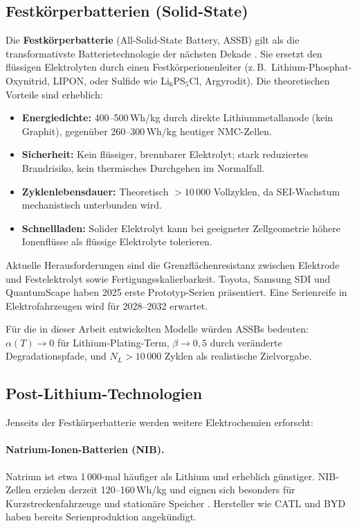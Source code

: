 ﻿\documentclass[a4paper,12pt]{article}
\theoremstyle{definition}
\begin{document}
\subsection{Festk\"orperbatterien (Solid-State)}

Die \textbf{Festk\"orperbatterie} (All-Solid-State Battery, ASSB) gilt als
die transformativste Batterietechnologie der n\"achsten Dekade \cite{Janek2016}.
Sie ersetzt den fl\"ussigen Elektrolyten durch einen Festk\"orperionenleiter
(z.\,B.\ Lithium-Phosphat-Oxynitrid, LIPON, oder Sulfide wie
Li$_6$PS$_5$Cl, Argyrodit). Die theoretischen Vorteile sind erheblich:

\begin{itemize}
  \item \textbf{Energiedichte:} 400--500\,Wh/kg durch direkte Lithiummetallanode
    (kein Graphit), gegen\"uber 260--300\,Wh/kg heutiger NMC-Zellen.
  \item \textbf{Sicherheit:} Kein fl\"ussiger, brennbarer Elektrolyt;
    stark reduziertes Brandrisiko, kein thermisches Durchgehen im Normalfall.
  \item \textbf{Zyklenlebensdauer:} Theoretisch $>10\,000$ Vollzyklen,
    da SEI-Wachstum mechanistisch unterbunden wird.
  \item \textbf{Schnellladen:} Solider Elektrolyt kann bei geeigneter
    Zellgeometrie h\"ohere Ionenfl\"usse als fl\"ussige Elektrolyte tolerieren.
\end{itemize}

Aktuelle Herausforderungen sind die Grenzfl\"achenresistanz zwischen Elektrode
und Festelektrolyt sowie Fertigungsskalierbarkeit. Toyota, Samsung SDI und
QuantumScape haben 2025 erste Prototyp-Serien pr\"asentiert. Eine
Serienreife in Elektrofahrzeugen wird f\"ur 2028--2032 erwartet.

F\"ur die in dieser Arbeit entwickelten Modelle w\"urden ASSBs bedeuten:
$\alpha(T) \to 0$ f\"ur Lithium-Plating-Term, $\beta \to 0{,}5$ durch ver\"anderte
Degradationspfade, und $N_L > 10\,000$ Zyklen als realistische Zielvorgabe.

\subsection{Post-Lithium-Technologien}

Jenseits der Festk\"orperbatterie werden weitere Elektrochemien erforscht:

\paragraph{Natrium-Ionen-Batterien (NIB).}
Natrium ist etwa 1\,000-mal h\"aufiger als Lithium und erheblich g\"unstiger.
NIB-Zellen erzielen derzeit 120--160\,Wh/kg und eignen sich besonders f\"ur
Kurzstreckenfahrzeuge und station\"are Speicher \cite{Nayak2018}. Hersteller
wie CATL und BYD haben bereits Serienproduktion angek\"undigt.
\end{document}
